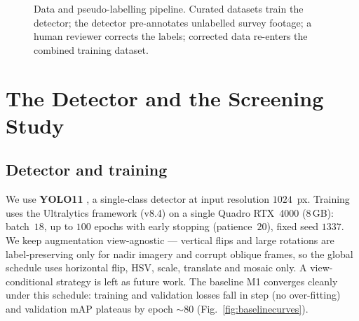 \documentclass[11pt,a4paper]{article}
\newcommand{\map}{mAP}
\newcommand{\imgsz}{1024}
\begin{document}
\begin{figure}[H]
\centering
{}
\caption{Data and pseudo-labelling pipeline. Curated datasets train the
detector; the detector pre-annotates unlabelled survey footage; a human
reviewer corrects the labels; corrected data re-enters the combined training
dataset.}
\label{fig:pipeline}
\end{figure}

\section{The Detector and the Screening Study}\label{sec:screening}
\subsection{Detector and training}
We use \textbf{YOLO11} \citep{khanam2024yolov11,ultralytics2023yolo}, a
single-class detector at input resolution $\imgsz$~px. Training uses the
Ultralytics framework (v8.4) on a single Quadro RTX~4000 (8\,GB): batch~$18$,
up to $100$ epochs with early stopping (patience~$20$), fixed seed $1337$. We
keep augmentation view-agnostic --- vertical flips and large rotations are
label-preserving only for nadir imagery and corrupt oblique frames, so the
global schedule uses horizontal flip, HSV, scale, translate and mosaic only. A
view-conditional strategy is left as future work. The baseline M1 converges
cleanly under this schedule: training and validation losses fall in step (no
over-fitting) and validation \map{} plateaus by epoch $\sim\!80$
(Fig.~\ref{fig:baselinecurves}).
\end{document}
